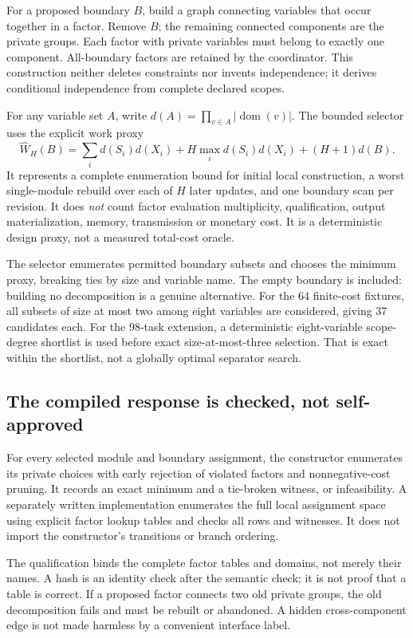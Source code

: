 \documentclass[11pt,letterpaper]{article}
\theoremstyle{definition}\newtheorem{definition}[theorem]{Definition}
\theoremstyle{remark}\newtheorem{remark}[theorem]{Remark}
\newcommand{\dom}{\operatorname{dom}}\newcommand{\supp}{\operatorname{supp}}
\begin{document}
For a proposed boundary $B$, build a graph connecting variables that occur together in a factor. Remove $B$; the remaining connected components are the private groups. Each factor with private variables must belong to exactly one component. All-boundary factors are retained by the coordinator. This construction neither deletes constraints nor invents independence; it derives conditional independence from complete declared scopes.

For any variable set $A$, write $d(A)=\prod_{v\in A}|\dom(v)|$. The bounded selector uses the explicit work proxy
\begin{equation}
 \widehat W_H(B)=\sum_i d(S_i)d(X_i)
 +H\max_i d(S_i)d(X_i)+(H+1)d(B).
 \label{eq:proxy}
\end{equation}
It represents a complete enumeration bound for initial local construction, a worst single-module rebuild over each of $H$ later updates, and one boundary scan per revision. It does \emph{not} count factor evaluation multiplicity, qualification, output materialization, memory, transmission or monetary cost. It is a deterministic design proxy, not a measured total-cost oracle.

The selector enumerates permitted boundary subsets and chooses the minimum proxy, breaking ties by size and variable name. The empty boundary is included: building no decomposition is a genuine alternative. For the 64 finite-cost fixtures, all subsets of size at most two among eight variables are considered, giving 37 candidates each. For the 98-task extension, a deterministic eight-variable scope-degree shortlist is used before exact size-at-most-three selection. That is exact within the shortlist, not a globally optimal separator search.

\subsection{The compiled response is checked, not self-approved}
For every selected module and boundary assignment, the constructor enumerates its private choices with early rejection of violated factors and nonnegative-cost pruning. It records an exact minimum and a tie-broken witness, or infeasibility. A separately written implementation enumerates the full local assignment space using explicit factor lookup tables and checks all rows and witnesses. It does not import the constructor's transitions or branch ordering.

The qualification binds the complete factor tables and domains, not merely their names. A hash is an identity check after the semantic check; it is not proof that a table is correct. If a proposed factor connects two old private groups, the old decomposition fails and must be rebuilt or abandoned. A hidden cross-component edge is not made harmless by a convenient interface label.
\end{document}
